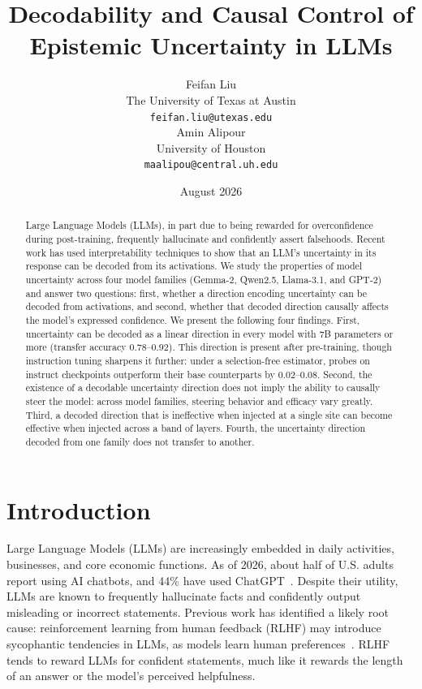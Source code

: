 \documentclass{article}
\title{Decodability and Causal Control of Epistemic Uncertainty in LLMs}
\author{
    Feifan Liu \\
    The University of Texas at Austin \\
    \texttt{feifan.liu@utexas.edu} \\
    \And
    Amin Alipour \\
    University of Houston \\
    \texttt{maalipou@central.uh.edu} \\
}
\date{August 2026}
\begin{document}
\maketitle

\begin{abstract}

    Large Language Models (LLMs), in part due to being rewarded for overconfidence during post-training, frequently hallucinate and confidently assert falsehoods. Recent work has used interpretability techniques to show that an LLM's uncertainty in its response can be decoded from its activations. We study the properties of model uncertainty across four model families (Gemma-2, Qwen2.5, Llama-3.1, and GPT-2) and answer two questions: first, whether a direction encoding uncertainty can be decoded from activations, and second, whether that decoded direction causally affects the model's expressed confidence. We present the following four findings. First, uncertainty can be decoded as a linear direction in every model with 7B parameters or more (transfer accuracy $0.78$--$0.92$). This direction is present after pre-training, though instruction tuning sharpens it further: under a selection-free estimator, probes on instruct checkpoints outperform their base counterparts by $0.02$--$0.08$. Second, the existence of a decodable uncertainty direction does not imply the ability to causally steer the model: across model families, steering behavior and efficacy vary greatly. Third, a decoded direction that is ineffective when injected at a single site can become effective when injected across a band of layers. Fourth, the uncertainty direction decoded from one family does not transfer to another.

\end{abstract}

\section{Introduction}

Large Language Models (LLMs) are increasingly embedded in daily activities, businesses, and core economic functions. As of 2026, about half of U.S. adults report using AI chatbots, and 44\% have used ChatGPT~\citep{pew2026ai}. Despite their utility, LLMs are known to frequently hallucinate facts and confidently output misleading or incorrect statements. Previous work has identified a likely root cause: reinforcement learning from human feedback (RLHF) may introduce sycophantic tendencies in LLMs, as models learn human preferences~\citep{sharma2023sycophancy}. RLHF tends to reward LLMs for confident statements, much like it rewards the length of an answer or the model's perceived helpfulness.
\end{document}

